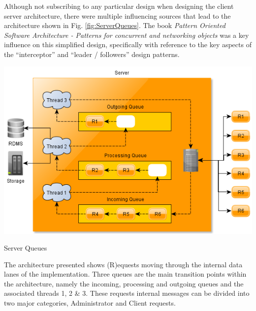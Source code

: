 		\normalsize
		{
			Although not subscribing to any particular design when designing the client server architecture,
			there were multiple influencing sources that lead to the architecture shown in Fig. \ref{fig:ServerQueues}.
			The book \textit{Pattern Oriented Software Architecture - Patterns for concurrent and networking objects} was a key 				
			influence on this simplified design, specifically with reference to the key aspects of the ``interceptor'' and ``leader / followers''
			design patterns.
			
			\noindent\begin{minipage}{\textwidth}
			
				\begin{figurehere}
					\centering
					\includegraphics[scale=0.7]{pages/chapter3/figures/server-marchitecture.png}
					\caption{Server Queues}
					\label{fig:ServerQueues}
				\end{figurehere}	
			
			\end{minipage}
			
			\vspace{5mm}
			The architecture presented shows (R)equests moving through the internal data lanes of the implementation.
			Three queues are the main transition points within the architecture, namely the incoming, processing and 
			outgoing queues and the associated threads 1, 2 \& 3.  
			These requests internal messages can be divided into two major categories, Administrator and Client requests.
						
			\vspace{-3mm}
			\begin{multicols}{2}	
			

\end{multicols}}
